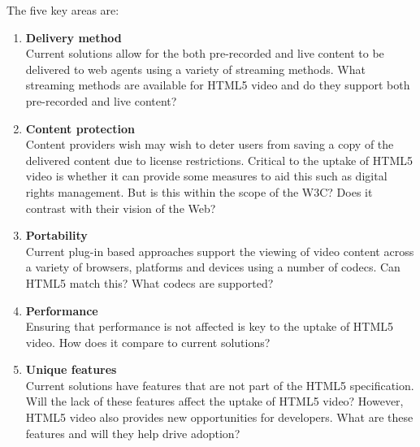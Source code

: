 \documentclass[a4paper]{article}
\begin{document}
The five key areas are:
\begin{enumerate}
\item \textbf{Delivery method} \\
Current solutions allow for the both pre-recorded and live content to be delivered to web agents using a variety of streaming methods. What streaming methods are available for HTML5 video and do they support both pre-recorded and live content?
\item \textbf{Content protection} \\
Content providers wish may wish to deter users from saving a copy of the delivered content due to license restrictions. Critical to the uptake of HTML5 video is whether it can provide some measures to aid this such as digital rights management. But is this within the scope of the W3C? Does it contrast with their vision of the Web? 
\item \textbf{Portability} \\
Current plug-in based approaches support the viewing of video content across a variety of browsers, platforms and devices using a number of codecs. Can HTML5 match this? What codecs are supported?
\item \textbf{Performance} \\
Ensuring that performance is not affected is key to the uptake of HTML5 video. How does it compare to current solutions?
\item \textbf{Unique features} \\
Current solutions have features that are not part of the HTML5 specification. Will the lack of these features affect the uptake of HTML5 video? However, HTML5 video also provides new opportunities for developers. What are these features and will they help drive adoption?
\end{enumerate}
\end{document}
